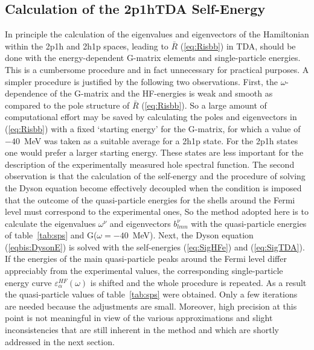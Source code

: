\subsection{Calculation of the 2p1hTDA Self-Energy}
In principle the calculation of the eigenvalues and eigenvectors of the 
Hamiltonian 
within the 2p1h and 2h1p spaces, leading to $\bar{R}$ (\ref{eq:Risbb}) 
in TDA, should be done with the energy-dependent G-matrix elements and 
single-particle energies. This is a cumbersome procedure and in fact 
unnecessary for practical purposes. A simpler procedure is justified by the 
following two observations.  First, the $\omega$-dependence of the G-matrix 
and the HF-energies is weak and smooth as compared to the pole structure of 
$\bar{R}$ (\ref{eq:Risbb}). So a large amount of computational effort may be 
saved by calculating the poles and eigenvectors in (\ref{eq:Risbb}) with a 
fixed `starting energy' for the G-matrix, for which a value of 
$-40$~MeV was taken
as a suitable average for a 2h1p state. For the 2p1h
states one would prefer  a larger starting energy. These states are less 
important for the 
description of the experimentally measured hole spectral function.
The second observation is that
the calculation of the self-energy and the procedure of solving the Dyson 
equation become effectively decoupled 
when the condition is imposed that the outcome of the quasi-particle energies 
for the shells around the Fermi level must correspond to the experimental ones,
So the method adopted here is to
calculate the eigenvalues $\omega^\nu$ and eigenvectors $b^\nu_{lmn}$ with the 
quasi-particle energies of table~\ref{tab:sps} and G($\omega=-40$~MeV).
Next, the Dyson equation (\ref{eqbis:DysonE}) is solved with the self-energies 
(\ref{eq:SigHFe}) and (\ref{eq:SigTDA}). 
If the energies of the main quasi-particle peaks around the Fermi level differ 
appreciably from the experimental values, the corresponding single-particle 
energy curve $\varepsilon^{HF}_\alpha(\omega)$ 
is shifted and the whole procedure is 
repeated. As a result the quasi-particle values of table~\ref{tab:sps} were 
obtained. Only a few iterations are needed because the adjustments are small.  
Moreover, high precision at this point is not meaningful in view of the 
various approximations and slight inconsistencies that are still inherent in 
the method and which are shortly addressed in the next section.

